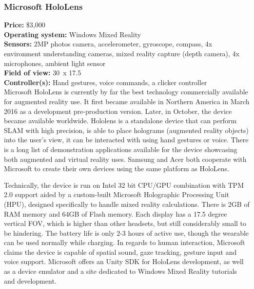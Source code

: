\documentclass[12pt, a4paper]{article}
\begin{document}
\subsubsection{Microsoft HoloLens}
\vspace*{-5mm}
\textbf{Price:} \$3,000\\
\textbf{Operating system:} Windows Mixed Reality\\
\textbf{Sensors:} 2MP photos camera, accelerometer, gyroscope, compass, 4x environment understanding cameras, mixed reality capture (depth camera), 4x microphones, ambient light sensor\\
\textbf{Field of view:}  30\degree~x 17.5\degree\\
\textbf{Controller(s):} Hand gestures, voice commands, a clicker controller \bigskip \\
Microsoft HoloLens is currently by far the best technology commercially available for augmented reality use. It first became available in Northern America in March 2016 as a development pre-production version. Later, in October, the device became available worldwide. Hololens is a standalone device that can perform SLAM with high precision, is able to place holograms (augmented reality objects) into the user’s view, it can be interacted with using hand gestures or voice. There is a long list of demonstration applications available for the device showcasing both augmented and virtual reality uses. Samsung and Acer both cooperate with Microsoft to create their own devices using the same platform as HoloLens.

Technically, the device is run on Intel 32 bit CPU/GPU combination with TPM 2.0 support aided by a custom-built Microsoft Holographic Processing Unit (HPU), designed specifically to handle mixed reality calculations. There is 2GB of RAM memory and 64GB of Flash memory. Each display has a 17.5 degree vertical FOV, which is higher than other headsets, but still considerably small to be hindering. The battery life is only 2-3 hours of active use, though the wearable can be used normally while charging. In regards to human interaction, Microsoft claims the device is capable of spatial sound, gaze tracking, gesture input and voice support. Microsoft offers an Unity SDK for HoloLens development, as well as a device emulator and a site dedicated to Windows Mixed Reality tutorials and development.

\end{document}
